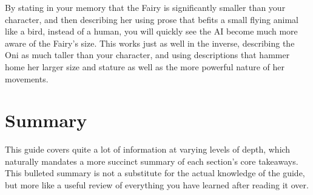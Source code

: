 ﻿\documentclass[Coomer-main.tex]{subfiles}
\begin{document}
By stating in your memory that the Fairy is significantly smaller than your character, and then describing her using prose that befits a small flying animal like a bird, instead of a human, you will quickly see the AI become much more aware of the Fairy’s size.
This works just as well in the inverse, describing the Oni as much taller than your character, and using descriptions that hammer home her larger size and stature as well as the more powerful nature of her movements.

\chapter{Summary}
\label{ch:summary}

This guide covers quite a lot of information at varying levels of depth, which naturally mandates a more succinct summary of each section's core takeaways.
This bulleted summary is not a substitute for the actual knowledge of the guide, but more like a useful review of everything you have learned after reading it over.
\end{document}

